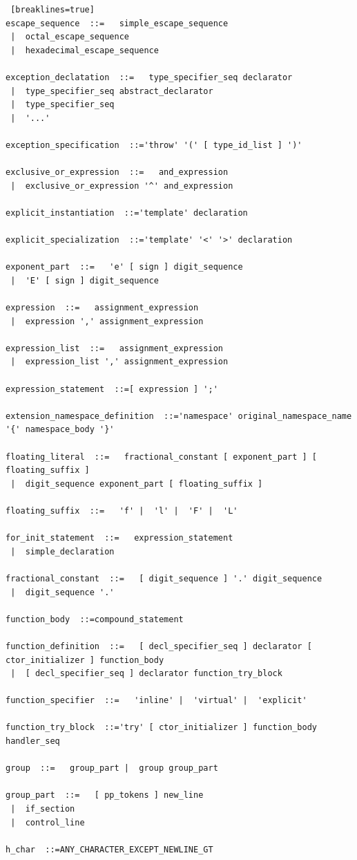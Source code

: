 \documentclass[11pt]{book}
\begin{document}
\begin{lstlisting} [breaklines=true]
escape_sequence  ::=   simple_escape_sequence
 |  octal_escape_sequence
 |  hexadecimal_escape_sequence

exception_declatation  ::=   type_specifier_seq declarator
 |  type_specifier_seq abstract_declarator
 |  type_specifier_seq
 |  '...'

exception_specification  ::='throw' '(' [ type_id_list ] ')'

exclusive_or_expression  ::=   and_expression
 |  exclusive_or_expression '^' and_expression

explicit_instantiation  ::='template' declaration

explicit_specialization  ::='template' '<' '>' declaration

exponent_part  ::=   'e' [ sign ] digit_sequence
 |  'E' [ sign ] digit_sequence

expression  ::=   assignment_expression
 |  expression ',' assignment_expression

expression_list  ::=   assignment_expression
 |  expression_list ',' assignment_expression

expression_statement  ::=[ expression ] ';'

extension_namespace_definition  ::='namespace' original_namespace_name '{' namespace_body '}'

floating_literal  ::=   fractional_constant [ exponent_part ] [ floating_suffix ]
 |  digit_sequence exponent_part [ floating_suffix ]

floating_suffix  ::=   'f' |  'l' |  'F' |  'L'

for_init_statement  ::=   expression_statement
 |  simple_declaration

fractional_constant  ::=   [ digit_sequence ] '.' digit_sequence
 |  digit_sequence '.'

function_body  ::=compound_statement

function_definition  ::=   [ decl_specifier_seq ] declarator [ ctor_initializer ] function_body
 |  [ decl_specifier_seq ] declarator function_try_block

function_specifier  ::=   'inline' |  'virtual' |  'explicit'

function_try_block  ::='try' [ ctor_initializer ] function_body handler_seq

group  ::=   group_part |  group group_part

group_part  ::=   [ pp_tokens ] new_line
 |  if_section
 |  control_line

h_char  ::=ANY_CHARACTER_EXCEPT_NEWLINE_GT


\end{lstlisting}
\end{document}

